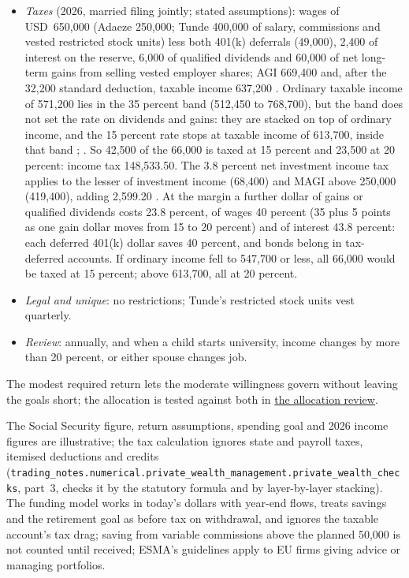 \begin{qfmethod}
\begin{itemize}
\item \emph{Taxes} (2026, married filing jointly; stated assumptions): wages of USD~650,000 (Adaeze 250,000; Tunde 400,000 of salary, commissions and vested restricted stock units) less both 401(k) deferrals (49,000), 2,400 of interest on the reserve, 6,000 of qualified dividends and 60,000 of net long-term gains from selling vested employer shares; AGI 669,400 and, after the 32,200 standard deduction, taxable income 637,200 \citep[secs.~4.01, 4.14]{irs-rev-proc-2025-32}. Ordinary taxable income of 571,200 lies in the 35 percent band (512,450 to 768,700), but the band does not set the rate on dividends and gains: they are stacked on top of ordinary income, and the 15 percent rate stops at taxable income of 613,700, inside that band \citep[sec.~4.03]{irs-rev-proc-2025-32}; \citep[sec.~1(h)(1), (h)(11), (j)(5)]{us-internal-revenue-code-26}. So 42,500 of the 66,000 is taxed at 15 percent and 23,500 at 20 percent: income tax 148,533.50. The 3.8 percent net investment income tax applies to the lesser of investment income (68,400) and MAGI above 250,000 (419,400), adding 2,599.20 \citep[sec.~1411]{us-internal-revenue-code-26}. At the margin a further dollar of gains or qualified dividends costs 23.8 percent, of wages 40 percent (35 plus 5 points as one gain dollar moves from 15 to 20 percent) and of interest 43.8 percent: each deferred 401(k) dollar saves 40 percent, and bonds belong in tax-deferred accounts. If ordinary income fell to 547,700 or less, all 66,000 would be taxed at 15 percent; above 613,700, all at 20 percent.
\item \emph{Legal and unique}: no restrictions; Tunde's restricted stock units vest quarterly.
\item \emph{Review}: annually, and when a child starts university, income changes by more than 20 percent, or either spouse changes job.
\end{itemize}
The modest required return lets the moderate willingness govern without leaving the goals short; the allocation is tested against both in \hyperref[meth:private-client-allocation-review]{the allocation review}.

 The Social Security figure, return assumptions, spending goal and 2026 income figures are illustrative; the tax calculation ignores state and payroll taxes, itemised deductions and credits (\nolinkurl{trading_notes.numerical.private_wealth_management.private_wealth_checks}, part~3, checks it by the statutory formula and by layer-by-layer stacking). The funding model works in today's dollars with year-end flows, treats savings and the retirement goal as before tax on withdrawal, and ignores the taxable account's tax drag; saving from variable commissions above the planned 50,000 is not counted until received; ESMA's guidelines apply to EU firms giving advice or managing portfolios.


\end{qfmethod}
